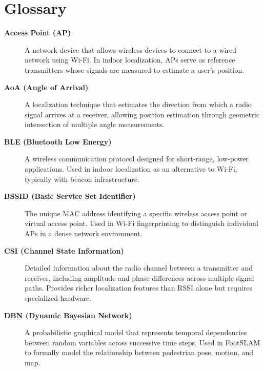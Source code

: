 \documentclass{ipgpmaster}
\begin{document}
  

 \newpage
\section*{Glossary}

\begin{description}

\item[\textbf{Access Point (AP)}]
A network device that allows wireless devices to connect to a wired network using Wi-Fi. In indoor localization, APs serve as reference transmitters whose signals are measured to estimate a user's position.

\item[\textbf{AoA (Angle of Arrival)}]
A localization technique that estimates the direction from which a radio signal arrives at a receiver, allowing position estimation through geometric intersection of multiple angle measurements.

\item[\textbf{BLE (Bluetooth Low Energy)}]
A wireless communication protocol designed for short-range, low-power applications. Used in indoor localization as an alternative to Wi-Fi, typically with beacon infrastructure.

\item[\textbf{BSSID (Basic Service Set Identifier)}]
The unique MAC address identifying a specific wireless access point or virtual access point. Used in Wi-Fi fingerprinting to distinguish individual APs in a dense network environment.

\item[\textbf{CSI (Channel State Information)}]
Detailed information about the radio channel between a transmitter and receiver, including amplitude and phase differences across multiple signal paths. Provides richer localization features than RSSI alone but requires specialized hardware.

\item[\textbf{DBN (Dynamic Bayesian Network)}]
A probabilistic graphical model that represents temporal dependencies between random variables across successive time steps. Used in FootSLAM to formally model the relationship between pedestrian pose, motion, and map.


\end{description}
\end{document}
